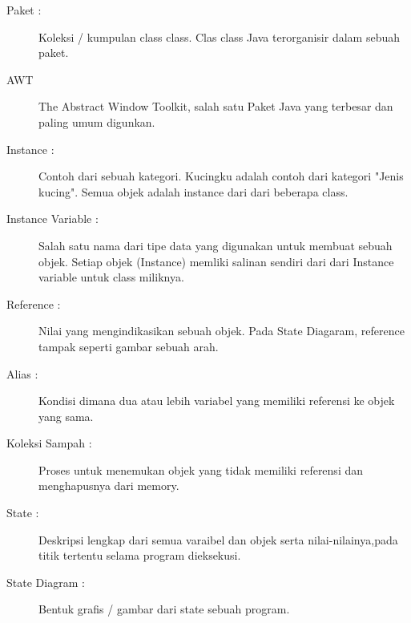 \begin{description}
\item [Paket :] Koleksi / kumpulan class class. Clas class Java terorganisir dalam sebuah paket.
\item[AWT] The Abstract Window Toolkit, salah satu Paket Java yang terbesar dan paling umum digunkan.
\item[Instance :] Contoh dari sebuah kategori. Kucingku adalah contoh dari kategori "Jenis kucing". Semua objek adalah instance dari dari beberapa class.
\item[Instance Variable :] Salah satu nama dari tipe data yang digunakan untuk membuat sebuah objek. Setiap objek (Instance) memliki salinan sendiri dari dari Instance variable  untuk class miliknya.
\item[Reference :] Nilai yang mengindikasikan sebuah objek. Pada State Diagaram, reference tampak seperti gambar sebuah arah.
\item[Alias :] Kondisi dimana dua atau lebih variabel yang memiliki referensi ke objek yang sama.
\item[Koleksi Sampah :] Proses untuk menemukan objek yang tidak memiliki referensi dan menghapusnya dari memory.
\item[State :] Deskripsi lengkap dari semua varaibel dan objek serta nilai-nilainya,pada titik tertentu selama program dieksekusi.
\item[State Diagram :] Bentuk grafis / gambar dari state sebuah program.
\end{description} 
